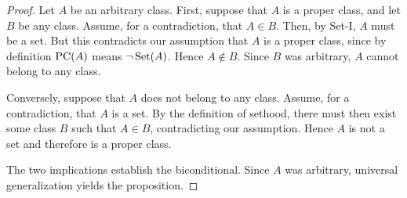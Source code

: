 \begin{proof}
Let \(A\) be an arbitrary class. First, suppose that
\(A\) is a proper class, and let \(B\) be any class.
Assume, for a contradiction, that \(A\in B\).
Then, by Set-I, \(A\) must be a set. But this
contradicts our assumption that \(A\) is a proper
class, since by definition \(\operatorname{PC}(A)\) means
\(\neg\operatorname{Set}(A)\). Hence \(A\notin B\). Since \(B\)
was arbitrary, \(A\) cannot belong to any class.

Conversely, suppose that \(A\) does not belong to
any class. Assume, for a contradiction, that \(A\)
is a set. By the definition of sethood, there
must then exist some class \(B\) such that
\(A\in B\), contradicting our assumption.
Hence \(A\) is not a set and therefore is a
proper class.

The two implications establish the biconditional.
Since \(A\) was arbitrary, universal generalization
yields the proposition.
\end{proof}


